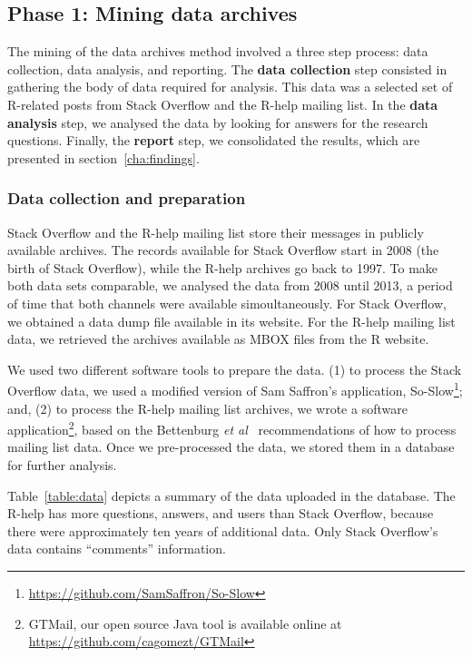 \documentclass{sig-alternate-05-2015}
\begin{document}
\subsection{Phase 1: Mining data archives} 
\label{sec:studyDesign}

	The mining of the data archives method involved a three step process: data collection, data analysis, and reporting.%
	The \textbf{data collection} step consisted in gathering the body of data required for analysis.
	This data was a selected set of R-related posts from Stack Overflow and the R-help mailing list.
	In the \textbf{data analysis} step, we analysed the data by looking for answers for the research questions.
	Finally, the \textbf{report} step, we consolidated the results, which are presented in section~\ref{cha:findings}.

\subsubsection{Data collection and preparation}
\label{subsec:preparation}

	Stack Overflow and the R-help mailing list store their messages in publicly available archives.
	The records available for Stack Overflow start in 2008 (the birth of Stack Overflow), while the R-help archives go back to 1997.
	To make both data sets comparable, we analysed the data from 2008 until 2013, a period of time that both channels were available simoultaneously.
For Stack Overflow, we obtained a data dump file available in its website.
For the R-help mailing list data, we retrieved the archives available as MBOX files from the R website.

	We used two different software tools to prepare the data.
	(1) to process the Stack Overflow data, we used a modified version of Sam Saffron's application, So-Slow\footnote{\url{https://github.com/SamSaffron/So-Slow}}; and,
	(2) to process the R-help mailing list archives, we wrote a software application\footnote{GTMail, our open source Java tool is available online at \url{https://github.com/cagomezt/GTMail}}, based on the Bettenburg \textit{et al}~\cite{Bettenburg2009} recommendations of how to process mailing list data.
    Once we pre-processed the data, we stored them in a database for further analysis.

	Table~\ref{table:data} depicts a summary of the data uploaded in the database.
	The R-help has more questions, answers, and users than Stack Overflow, because there were approximately ten years of additional data.
	Only Stack Overflow's data contains ``comments'' information. %
\end{document}

